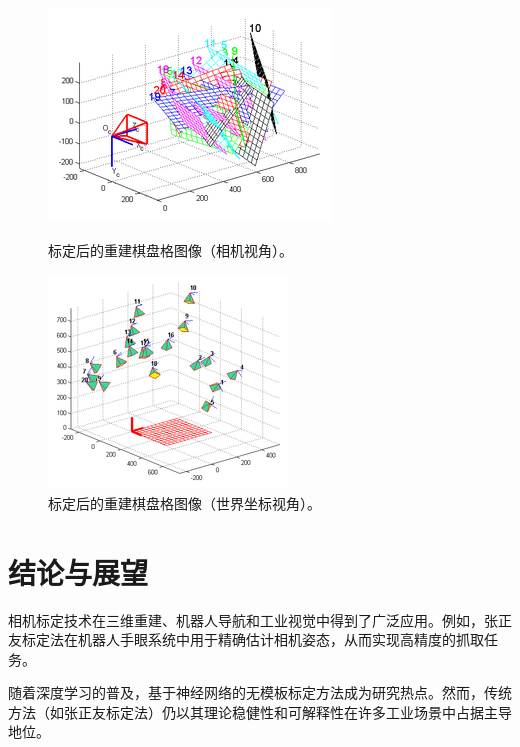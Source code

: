 \documentclass[hyperref,a4paper,UTF8]{ctexart}
\begin{document}
\begin{figure}[H]
    \centering
    \begin{minipage}{0.48\textwidth}
        \centering
        \includegraphics[width=\textwidth]{assets/283px-Reconstructed_boards_camera.png}
        \caption{标定后的重建棋盘格图像（相机视角）。}
        \label{fig:reconstructed_boards_camera}
    \end{minipage}
    \hfill
    \begin{minipage}{0.48\textwidth}
        \centering
        \includegraphics[width=\textwidth]{assets/241px-Reconstructed_boards_world.png}
        \caption{标定后的重建棋盘格图像（世界坐标视角）。}
        \label{fig:reconstructed_boards_world}
    \end{minipage}
\end{figure}

\section{结论与展望}

相机标定技术在三维重建、机器人导航和工业视觉中得到了广泛应用。例如，张正友标定法在机器人手眼系统中用于精确估计相机姿态，从而实现高精度的抓取任务\citep{bouguet2001camera}。

随着深度学习的普及，基于神经网络的无模板标定方法成为研究热点。然而，传统方法（如张正友标定法）仍以其理论稳健性和可解释性在许多工业场景中占据主导地位\citep{ma2003invitation}。

  
\end{document}
